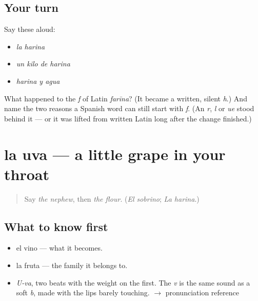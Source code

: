 \subsection*{Your turn}
Say these aloud:

\begin{itemize}
\raggedright
  \item \emph{la harina}
  \item \emph{un kilo de harina}
  \item \emph{harina y agua}
\end{itemize}

\begin{tcolorbox}[breakable,colback=teal!4,colframe=teal!35!black,title={Before you move on}]
What happened to the \emph{f} of Latin \emph{farīna}? (It became a written, silent \emph{h}.) And name the two reasons a Spanish word can still start with \emph{f}. (An \emph{r}, \emph{l} or \emph{ue} stood behind it — or it was lifted from written Latin long after the change finished.)
\end{tcolorbox}
\section[la uva]{la uva — a little grape in your throat}

\label{lesson:ES-C376-uva}



\begin{quote}
Say \emph{the nephew}, then \emph{the flour}. (\emph{El sobrino}; \emph{La harina}.)
\end{quote}

\subsection*{What to know first}
\begin{itemize}
\raggedright
  \item el vino — what it becomes.
  \item la fruta — the family it belongs to.
\end{itemize}

\begin{sounds}
\begin{itemize}
\raggedright
  \item \emph{U-va}, two beats with the weight on the first. The \emph{v} is the same sound as a soft \emph{b}, made with the lips barely touching. $\to$ pronunciation reference
\end{itemize}
\end{sounds}

